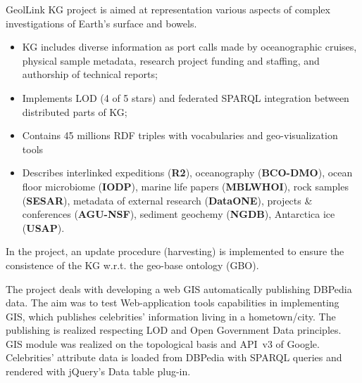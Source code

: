 \documentclass[
]{ceurart}
\begin{document}
  GeolLink KG project \cite{geolink} is aimed at representation various aspects of complex investigations of Earth's surface and bowels.
  \begin{itemize}
  \item KG includes diverse information as port calls made by oceanographic cruises, physical sample metadata, research project funding and staffing, and authorship of technical reports;
  \item Implements LOD (4 of 5 stars) and federated SPARQL integration between distributed parts of KG;
  \item Contains 45 millions RDF triples with vocabularies and geo-visualization tools
  \item Describes interlinked expeditions (\textbf{R2}), oceanography (\textbf{BCO-DMO}), ocean floor microbiome (\textbf{IODP}), marine life papers (\textbf{MBLWHOI}), rock samples (\textbf{SESAR}), metadata of external research (\textbf{DataONE}),  projects \& conferences (\textbf{AGU-NSF}), sediment geochemy (\textbf{NGDB}), Antarctica ice (\textbf{USAP}).
  \end{itemize}
  In the project, an update procedure (harvesting) is implemented to ensure the consistence of the KG w.r.t. the geo-base ontology (GBO).

   The project \cite{abid} deals with developing a web GIS automatically publishing DBPedia data.  The aim was to test Web-application tools capabilities in implementing GIS, which publishes celebrities' information living in a hometown/city. The publishing is realized respecting LOD and Open Government Data principles.   GIS module was realized on the topological basis and API~v3 of Google. Celebrities' attribute data is loaded from DBPedia with SPARQL queries and rendered with jQuery's Data table plug-in.
\end{document}
